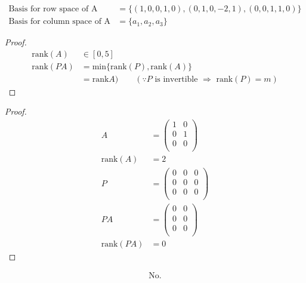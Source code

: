 \documentclass[12pt]{article}
\newenvironment{problem}[2][Problem]{\begin{trivlist}
\item[\hskip \labelsep {\bfseries #1}\hskip \labelsep {\bfseries #2.}]}{\end{trivlist}}
\begin{document}
\begin{problem}{4.b}
\end{problem}
\begin{align*}
\text{Basis for row space of A} &= \{(1, 0, 0, 1, 0), (0, 1, 0, -2, 1), (0, 0, 1, 1, 0)\} \\
\text{Basis for column space of A} &= \{a_1, a_2, a_3\}
\end{align*}

\begin{problem}{5.a}
\end{problem}
\begin{proof}
\begin{align*}
\text{rank}(A) &\in [0, 5]\\
\text{rank}(PA) &= \text{min}\{\text{rank}(P), \text{rank}(A)\} \\
&= \text{rank}A) \qquad (\text{$\because P$ is invertible $\Rightarrow$ rank$(P) = m$})
\end{align*}
\end{proof}

\begin{problem}{5.b}
\end{problem}
\begin{proof}
\begin{align*}
A &= \left( \begin{array}{cc}
	1 & 0 \\
	0 & 1 \\
	0 & 0 \\
\end{array} \right) \\
\text{rank}(A) &= 2 \\
P &= \left( \begin{array}{ccc}
	0 & 0 & 0 \\
	0 & 0 & 0 \\
	0 & 0 & 0 \\
\end{array} \right) \\
PA &= \left( \begin{array}{cc}
	0 & 0 \\
	0 & 0 \\
	0 & 0 \\
\end{array} \right) \\
\text{rank}(PA) &= 0
\end{align*}
\end{proof}

\begin{problem}{5.c}
\end{problem}
\begin{align*}
\text{No.}
\end{align*}
\end{document}

